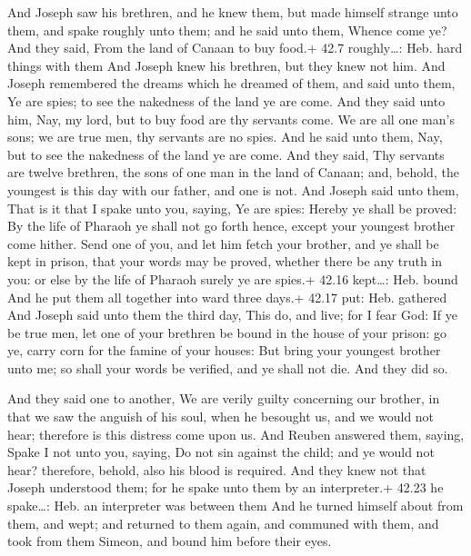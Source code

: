  And Joseph saw his brethren, and he knew them, but made
himself strange unto them, and spake roughly unto them; and he said unto
them, Whence come ye? And they said, From the land of Canaan to buy
food.+ 42.7 roughly\ldots: Heb. hard things with them  And
Joseph knew his brethren, but they knew not him.  And Joseph
remembered the dreams which he dreamed of them, and said unto them, Ye
are spies; to see the nakedness of the land ye are come. 
And they said unto him, Nay, my lord, but to buy food are thy servants
come.  We are all one man's sons; we are true men, thy
servants are no spies.  And he said unto them, Nay, but to
see the nakedness of the land ye are come.  And they said,
Thy servants are twelve brethren, the sons of one man in the land of
Canaan; and, behold, the youngest is this day with our father, and one
is not.  And Joseph said unto them, That is it that I spake
unto you, saying, Ye are spies:  Hereby ye shall be proved:
By the life of Pharaoh ye shall not go forth hence, except your youngest
brother come hither.  Send one of you, and let him fetch
your brother, and ye shall be kept in prison, that your words may be
proved, whether there be any truth in you: or else by the life of
Pharaoh surely ye are spies.+ 42.16 kept\ldots: Heb. bound 
And he put them all together into ward three days.+ 42.17 put: Heb.
gathered  And Joseph said unto them the third day, This do,
and live; for I fear God:  If ye be true men, let one of
your brethren be bound in the house of your prison: go ye, carry corn
for the famine of your houses:  But bring your youngest
brother unto me; so shall your words be verified, and ye shall not die.
And they did so.

 And they said one to another, We are verily guilty
concerning our brother, in that we saw the anguish of his soul, when he
besought us, and we would not hear; therefore is this distress come upon
us.  And Reuben answered them, saying, Spake I not unto
you, saying, Do not sin against the child; and ye would not hear?
therefore, behold, also his blood is required.  And they
knew not that Joseph understood them; for he spake unto them by an
interpreter.+ 42.23 he spake\ldots: Heb. an interpreter was between them
 And he turned himself about from them, and wept; and
returned to them again, and communed with them, and took from them
Simeon, and bound him before their eyes.

